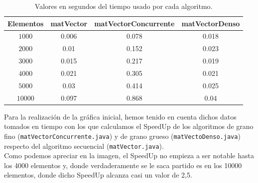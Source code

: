 \documentclass[12pt,letterpaper]{article}
\begin{document}
\begin{center}
	\begin{table}[htbp]
		\begin{center}
			\begin{tabular}{|c|c|c|c|}
				\hline
				\textbf{Elementos} & \textbf{matVector} & \textbf{matVectorConcurrente} & \textbf{matVectorDenso}  \\
				\hline 
				$1000$ & 0.006 & 0.078 & 0.018 \\ \hline
				$2000$ & 0.01 & 0.152 & 0.023 \\ \hline
				$3000$ & 0.015 & 0.217 & 0.019 \\ \hline
				$4000$ & 0.021 & 0.305 & 0.021 \\ \hline
				$5000$ & 0.03 & 0.414 & 0.025 \\ \hline
				$10000$ & 0.097 & 0.868 & 0.04 \\ \hline
			\end{tabular}
			\caption{Valores en segundos del tiempo usado por cada algoritmo.}
			\label{tabla:Valores en segundos del tiempo usado por cada algoritmo}
		\end{center}
	\end{table}
\end{center}
Para la realización de la gráfica inicial, hemos tenido en cuenta dichos datos tomados en tiempo con los que calculamos el SpeedUp de los algoritmos de grano fino (\texttt{matVectorConcurrente.java}) y de grano grueso (\texttt{matVectoDenso.java}) respecto del algoritmo secuencial (\texttt{matVector.java}).\\
Como podemos apreciar en la imagen, el SpeedUp no empieza a ser notable hasta los 4000 elementos y, donde verdaderamente se le saca partido es en los 10000 elementos, donde dicho SpeedUp alcanza casi un valor de 2,5.

	
\end{document}

